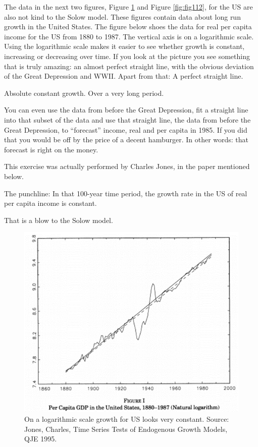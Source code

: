 \documentclass[
]{book}
\begin{document}
The data in the next two figures, Figure \ref{fig:fig111} and Figure \ref{fig:fig112}, for the US are also not kind to the Solow model. These figures contain data about long run growth in the United States. The figure below shoes the data for real per capita income for the US from 1880 to 1987. The vertical axis is on a logarithmic scale. Using the logarithmic scale makes it easier to see whether growth is constant, increasing or decreasing over time. If you look at the picture you see something that is truly amazing: an almost perfect straight line, with the obvious deviation of the Great Depression and WWII. Apart from that: A perfect straight line.

Absolute constant growth. Over a very long period.

You can even use the data from before the Great Depression, fit a straight line into that subset of the data and use that straight line, the data from before the Great Depression, to ``forecast'' income, real and per capita in 1985. If you did that you would be off by the price of a decent hamburger. In other words: that forecast is right on the money.

This exercise was actually performed by Charles Jones, in the paper mentioned below.

The punchline: In that 100-year time period, the growth rate in the US of real per capita income is constant.

That is a blow to the Solow model.

\begin{figure}

{\centering \includegraphics[width=1\linewidth]{img/ch1/growth11} 

}

\caption{On a logarithmic scale growth for US looks very constant. Source: Jones, Charles, Time Series Tests of Endogenous Growth Models, QJE 1995.}\label{fig:fig111}
\end{figure}
\end{document}
